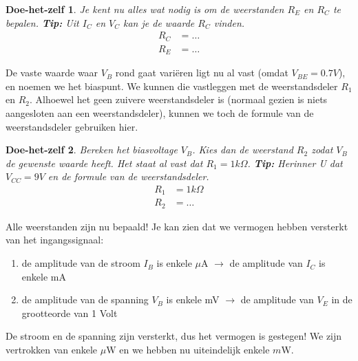 \documentclass{article}
\newtheorem{DIY}{Doe-het-zelf}
\begin{document}
				\begin{DIY} Je kent nu alles wat nodig is om de weerstanden $R_{E}$ en $ R_{C}$ te bepalen. \textbf{Tip:} Uit $I_C$ en $V_C$ kan je de waarde $R_C$ vinden.
				\begin{align}
				    R_C &= \ldots \\
				    R_E &= \ldots
				\end{align}
				\end{DIY}				

				De vaste waarde waar $V_B$ rond gaat vari\"eren ligt nu al vast (omdat $V_{BE} = 0.7V$), en noemen we het biaspunt. We kunnen die vastleggen met de weerstandsdeler $R_1$ en $R_2$. Alhoewel het geen zuivere weerstandsdeler is (normaal gezien is niets aangesloten aan een weerstandsdeler), kunnen we toch de formule van de weerstandsdeler gebruiken hier.

				\begin{DIY} Bereken het biasvoltage $V_B$. Kies dan de weerstand $R_2$ zodat $V_B$ de gewenste waarde heeft. Het staat al vast dat $R_1 = 1k\Omega$. \textbf{Tip:} Herinner U dat $V_{CC} = 9V$ en de formule van de weerstandsdeler.
				\begin{align}
				    R_1 &= 1k\Omega \\
				    R_2 &= \ldots
				\end{align}
				\end{DIY}

				Alle weerstanden zijn nu bepaald! Je kan zien dat we vermogen hebben versterkt van het ingangssignaal:

				\begin{enumerate}
				 	\item de amplitude van de stroom $I_B$ is enkele $\mu$A $\rightarrow$ de amplitude van $I_C$ is enkele mA
				 	\item de amplitude van de spanning $V_B$ is enkele mV $\rightarrow$ de amplitude van $V_E$ in de grootteorde van 1 Volt
				 \end{enumerate} 

				 De stroom en de spanning zijn  versterkt, dus het vermogen is gestegen! We zijn vertrokken van enkele $\mu$W en we hebben nu uiteindelijk enkele $m$W. 


				\begin{center}
					\noindent {}
				\end{center}
\end{document}
